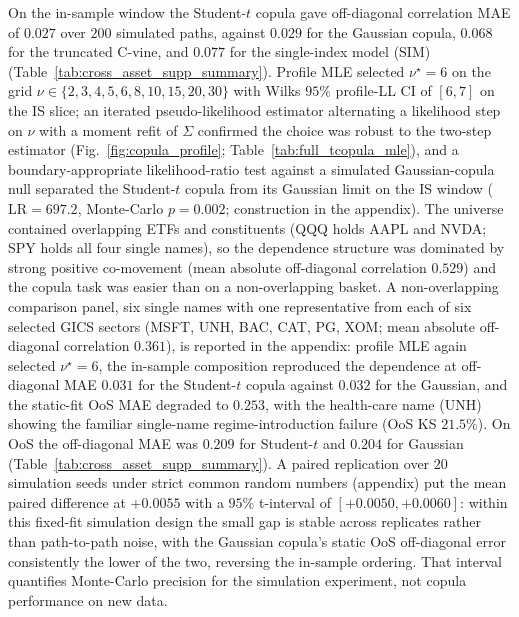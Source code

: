 On the in-sample window the Student-$t$ copula gave off-diagonal correlation MAE of $0.027$ over $200$ simulated paths, against $0.029$ for the Gaussian copula, $0.068$ for the truncated C-vine, and $0.077$ for the single-index model (SIM) (Table~\ref{tab:cross_asset_supp_summary}). Profile MLE selected $\nu^\star = 6$ on the grid $\nu \in \{2,3,4,5,6,8,10,15,20,30\}$ with Wilks $95\%$ profile-LL CI of $[6, 7]$ on the IS slice; an iterated pseudo-likelihood estimator alternating a likelihood step on $\nu$ with a moment refit of $\Sigma$ confirmed the choice was robust to the two-step estimator (Fig.~\ref{fig:copula_profile}; Table~\ref{tab:full_tcopula_mle}), and a boundary-appropriate likelihood-ratio test against a simulated Gaussian-copula null separated the Student-$t$ copula from its Gaussian limit on the IS window ($\mathrm{LR} = 697.2$, Monte-Carlo $p = 0.002$; construction in the appendix). The universe contained overlapping ETFs and constituents (QQQ holds AAPL and NVDA; SPY holds all four single names), so the dependence structure was dominated by strong positive co-movement (mean absolute off-diagonal correlation $0.529$) and the copula task was easier than on a non-overlapping basket. A non-overlapping comparison panel, six single names with one representative from each of six selected GICS sectors (MSFT, UNH, BAC, CAT, PG, XOM; mean absolute off-diagonal correlation $0.361$), is reported in the appendix: profile MLE again selected $\nu^\star = 6$, the in-sample composition reproduced the dependence at off-diagonal MAE $0.031$ for the Student-$t$ copula against $0.032$ for the Gaussian, and the static-fit OoS MAE degraded to $0.253$, with the health-care name (UNH) showing the familiar single-name regime-introduction failure (OoS KS $21.5\%$). On OoS the off-diagonal MAE was $0.209$ for Student-$t$ and $0.204$ for Gaussian (Table~\ref{tab:cross_asset_supp_summary}). A paired replication over $20$ simulation seeds under strict common random numbers (appendix) put the mean paired difference at $+0.0055$ with a $95\%$ t-interval of $[+0.0050, +0.0060]$: within this fixed-fit simulation design the small gap is stable across replicates rather than path-to-path noise, with the Gaussian copula's static OoS off-diagonal error consistently the lower of the two, reversing the in-sample ordering. That interval quantifies Monte-Carlo precision for the simulation experiment, not copula performance on new data.

